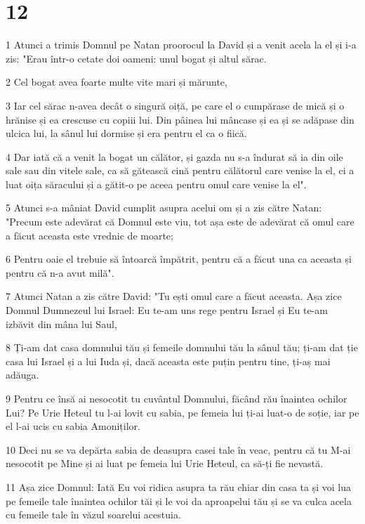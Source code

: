 \chapter{12}

\par 1 Atunci a trimis Domnul pe Natan proorocul la David și a venit acela la el și i-a zis: "Erau într-o cetate doi oameni: unul bogat și altul sărac.
\par 2 Cel bogat avea foarte multe vite mari și mărunte,
\par 3 Iar cel sărac n-avea decât o singură oiță, pe care el o cumpărase de mică și o hrănise și ea crescuse cu copiii lui. Din pâinea lui mâncase și ea și se adăpase din ulcica lui, la sânul lui dormise și era pentru el ca o fiică.
\par 4 Dar iată că a venit la bogat un călător, și gazda nu s-a îndurat să ia din oile sale sau din vitele sale, ca să gătească cină pentru călătorul care venise la el, ci a luat oița săracului și a gătit-o pe aceea pentru omul care venise la el".
\par 5 Atunci s-a mâniat David cumplit asupra acelui om și a zis către Natan: "Precum este adevărat că Domnul este viu, tot așa este de adevărat că omul care a făcut aceasta este vrednic de moarte;
\par 6 Pentru oaie el trebuie să întoarcă împătrit, pentru că a făcut una ca aceasta și pentru că n-a avut milă".
\par 7 Atunci Natan a zis către David: "Tu ești omul care a făcut aceasta. Așa zice Domnul Dumnezeul lui Israel: Eu te-am uns rege pentru Israel și Eu te-am izbăvit din mâna lui Saul,
\par 8 Ți-am dat casa domnului tău și femeile domnului tău la sânul tău; ți-am dat ție casa lui Israel și a lui Iuda și, dacă aceasta este puțin pentru tine, ți-aș mai adăuga.
\par 9 Pentru ce însă ai nesocotit tu cuvântul Domnului, făcând rău înaintea ochilor Lui? Pe Urie Heteul tu l-ai lovit cu sabia, pe femeia lui ți-ai luat-o de soție, iar pe el l-ai ucis cu sabia Amoniților.
\par 10 Deci nu se va depărta sabia de deasupra casei tale în veac, pentru că tu M-ai nesocotit pe Mine și ai luat pe femeia lui Urie Heteul, ca să-ți fie nevastă.
\par 11 Așa zice Domnul: Iată Eu voi ridica asupra ta rău chiar din casa ta și voi lua pe femeile tale înaintea ochilor tăi și le voi da aproapelui tău și se va culca acela cu femeile tale în văzul soarelui acestuia.
